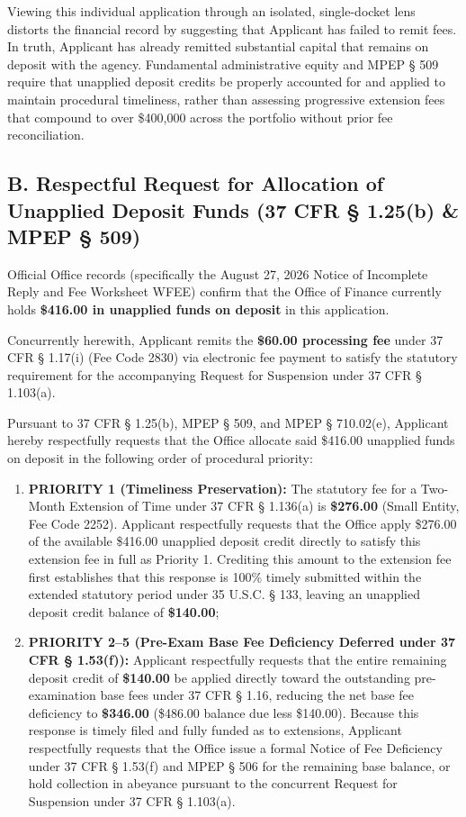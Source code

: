 \documentclass[11pt,letterpaper]{article}
\begin{document}
Viewing this individual application through an isolated, single-docket lens distorts the financial record by suggesting that Applicant has failed to remit fees. In truth, Applicant has already remitted substantial capital that remains on deposit with the agency. Fundamental administrative equity and MPEP \S{} 509 require that unapplied deposit credits be properly accounted for and applied to maintain procedural timeliness, rather than assessing progressive extension fees that compound to over \$400,000 across the portfolio without prior fee reconciliation.

\subsection*{B. Respectful Request for Allocation of Unapplied Deposit Funds (37 CFR \S{} 1.25(b) \& MPEP \S{} 509)}
Official Office records (specifically the August 27, 2026 Notice of Incomplete Reply and Fee Worksheet WFEE) confirm that the Office of Finance currently holds \textbf{\$416.00 in unapplied funds on deposit} in this application.

Concurrently herewith, Applicant remits the \textbf{\$60.00 processing fee} under 37 CFR \S{} 1.17(i) (Fee Code 2830) via electronic fee payment to satisfy the statutory requirement for the accompanying Request for Suspension under 37 CFR \S{} 1.103(a).

Pursuant to 37 CFR \S{} 1.25(b), MPEP \S{} 509, and MPEP \S{} 710.02(e), Applicant hereby respectfully requests that the Office allocate said \$416.00 unapplied funds on deposit in the following order of procedural priority:
\begin{enumerate}[leftmargin=*]
    \item \textbf{PRIORITY 1 (Timeliness Preservation):} The statutory fee for a Two-Month Extension of Time under 37 CFR \S{} 1.136(a) is \textbf{\$276.00} (Small Entity, Fee Code 2252). Applicant respectfully requests that the Office apply \$276.00 of the available \$416.00 unapplied deposit credit directly to satisfy this extension fee in full as Priority 1. Crediting this amount to the extension fee first establishes that this response is 100\% timely submitted within the extended statutory period under 35 U.S.C. \S{} 133, leaving an unapplied deposit credit balance of \textbf{\$140.00};
    \item \textbf{PRIORITY 2--5 (Pre-Exam Base Fee Deficiency Deferred under 37 CFR \S{} 1.53(f)):} Applicant respectfully requests that the entire remaining deposit credit of \textbf{\$140.00} be applied directly toward the outstanding pre-examination base fees under 37 CFR \S{} 1.16, reducing the net base fee deficiency to \textbf{\$346.00} (\$486.00 balance due less \$140.00). Because this response is timely filed and fully funded as to extensions, Applicant respectfully requests that the Office issue a formal Notice of Fee Deficiency under 37 CFR \S{} 1.53(f) and MPEP \S{} 506 for the remaining base balance, or hold collection in abeyance pursuant to the concurrent Request for Suspension under 37 CFR \S{} 1.103(a).
\end{enumerate}
\end{document}
